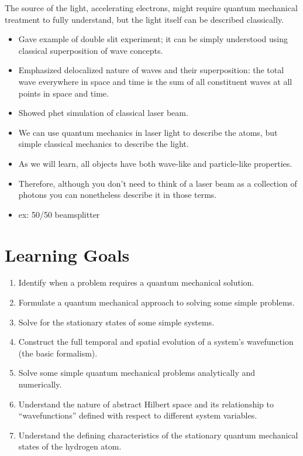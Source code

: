 \documentclass{article}
\begin{document}
The source of the light, accelerating electrons, might require quantum mechanical treatment to fully understand, but the light itself can be described classically.



\begin{itemize}
    \item Gave example of double slit experiment; it can be simply understood using classical superposition of wave concepts. 
    \item Emphasized delocalized nature of waves and their superposition: the total wave everywhere in space and time is the sum of all constituent waves at all points in space and time. 
    \item Showed phet simulation of classical laser beam. 
    \item We can use quantum mechanics in laser light to describe the atoms, but simple classical mechanics to describe the light. 
    \item As we will learn, all objects have both wave-like and particle-like properties. 
    \item Therefore, although you don't need to think of a laser beam as a collection of photons you can nonetheless describe it in those terms. 
    \item ex: 50/50 beamsplitter
\end{itemize}

\section{Learning Goals}

\begin{enumerate}
    \item Identify when a problem requires a quantum mechanical solution. 
    \item Formulate a quantum mechanical approach to solving some simple problems. 
    \item Solve for the stationary states of some simple systems.
    \item Construct the full temporal and spatial evolution of a system’s wavefunction (the basic formalism).
    \item Solve some simple quantum mechanical problems analytically and numerically.
    \item Understand the nature of abstract Hilbert space and its relationship to “wavefunctions” defined with respect to different system variables.
    \item Understand the defining characteristics of the stationary quantum mechanical states of the hydrogen atom.

\end{enumerate}
\end{document}
